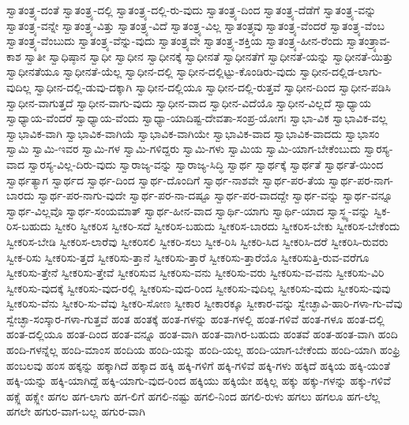 {ಸ್ವಾತಂತ್ರ್ಯ-ದಂತೆ
ಸ್ವಾತಂತ್ರ್ಯ-ದಲ್ಲಿ
ಸ್ವಾತಂತ್ರ್ಯ-ದಲ್ಲಿ-ರು-ವುದು
ಸ್ವಾತಂತ್ರ್ಯ-ದಿಂದ
ಸ್ವಾತಂತ್ರ್ಯ-ದೆಡೆಗೆ
ಸ್ವಾತಂತ್ರ್ಯ-ವನ್ನು
ಸ್ವಾತಂತ್ರ್ಯ-ವನ್ನೇ
ಸ್ವಾತಂತ್ರ್ಯ-ವಿತ್ತು
ಸ್ವಾತಂತ್ರ್ಯ-ವಿದೆ
ಸ್ವಾತಂತ್ರ್ಯ-ವಿಲ್ಲ
ಸ್ವಾತಂತ್ರ್ಯವು
ಸ್ವಾತಂತ್ರ್ಯ-ವೆಂದರೆ
ಸ್ವಾತಂತ್ರ್ಯ-ವೆಂಬ
ಸ್ವಾತಂತ್ರ್ಯ-ವೆಂಬುದು
ಸ್ವಾತಂತ್ರ್ಯ-ವೆನ್ನು-ವುದು
ಸ್ವಾತಂತ್ರ್ಯವೇ
ಸ್ವಾತಂತ್ರ್ಯ-ಶಕ್ತಿಯ
ಸ್ವಾತಂತ್ರ್ಯ-ಹೀನ-ರೆಂದು
ಸ್ವಾತಂತ್ರ್ಯಾವ-ಕಾಶ
ಸ್ವಾತೀ
ಸ್ವಾಧಿಷ್ಠಾನ
ಸ್ವಾಧೀ
ಸ್ವಾಧೀನ
ಸ್ವಾಧೀನಕ್ಕೆ
ಸ್ವಾಧೀನತೆ
ಸ್ವಾಧೀನತೆಗೆ
ಸ್ವಾಧೀನತೆ-ಯನ್ನು
ಸ್ವಾಧೀನತೆ-ಯಿತ್ತು
ಸ್ವಾಧೀನತೆಯೂ
ಸ್ವಾಧೀನತೆ-ಯೆಲ್ಲ
ಸ್ವಾಧೀನ-ದಲ್ಲಿ
ಸ್ವಾಧೀನ-ದಲ್ಲಿಟ್ಟು-ಕೊಂಡಿರು-ವುದು
ಸ್ವಾಧೀನ-ದಲ್ಲಿಡ-ಲಾಗು-ವುದಿಲ್ಲ
ಸ್ವಾಧೀನ-ದಲ್ಲಿ-ಡುವು-ದಕ್ಕಾಗಿ
ಸ್ವಾಧೀನ-ದಲ್ಲಿಯೂ
ಸ್ವಾಧೀನ-ದಲ್ಲಿ-ರುತ್ತವೆ
ಸ್ವಾಧೀನ-ದಿಂದ
ಸ್ವಾಧೀನ-ಪಡಿಸಿ
ಸ್ವಾಧೀನ-ವಾಗುತ್ತದೆ
ಸ್ವಾಧೀನ-ವಾಗು-ವುದು
ಸ್ವಾಧೀನ-ವಾದ
ಸ್ವಾಧೀನ-ವಿದೆಯೊ
ಸ್ವಾಧೀನ-ವಿಲ್ಲದೆ
ಸ್ವಾಧ್ಯಾಯ
ಸ್ವಾಧ್ಯಾಯ-ವೆಂದರೆ
ಸ್ವಾಧ್ಯಾಯ-ವೆಂದು
ಸ್ವಾಧ್ಯಾ-ಯಾದಿಷ್ಟ-ದೇವತಾ-ಸಂಪ್ರ-ಯೋಗಃ
ಸ್ವಾಭಾ-ವಿಕ
ಸ್ವಾಭಾವಿಕ-ವಲ್ಲ
ಸ್ವಾಭಾವಿಕ-ವಾಗಿ
ಸ್ವಾಭಾವಿಕ-ವಾಗಿಯೆ
ಸ್ವಾಭಾವಿಕ-ವಾಗಿಯೇ
ಸ್ವಾಭಾವಿಕ-ವಾದ
ಸ್ವಾಭಾವಿಕ-ವಾದದು
ಸ್ವಾಭಾಸಂ
ಸ್ವಾಮಿ
ಸ್ವಾಮಿ-ಇವರ
ಸ್ವಾಮಿ-ಗಳ
ಸ್ವಾಮಿ-ಗಳಿದ್ದರು
ಸ್ವಾಮಿ-ಗಳು
ಸ್ವಾಮಿಯ
ಸ್ವಾಮಿ-ಯಾಗ-ಬೇಕೆಂಬುದು
ಸ್ವಾರಸ್ಯ-ವಾದ
ಸ್ವಾರಸ್ಯ-ವಿಲ್ಲ-ದಿರು-ವುದು
ಸ್ವಾರಾಜ್ಯ-ವನ್ನು
ಸ್ವಾರಾಜ್ಯ-ಸಿದ್ಧಿ
ಸ್ವಾರ್ಥ
ಸ್ವಾರ್ಥಕ್ಕೆ
ಸ್ವಾರ್ಥತೆ
ಸ್ವಾರ್ಥತೆ-ಯಿಂದ
ಸ್ವಾರ್ಥತ್ಯಾಗ
ಸ್ವಾರ್ಥದ
ಸ್ವಾರ್ಥ-ದಿಂದ
ಸ್ವಾರ್ಥ-ದೊಂದಿಗೆ
ಸ್ವಾರ್ಥ-ನಾಶವೇ
ಸ್ವಾರ್ಥ-ಪರ-ತೆಯ
ಸ್ವಾರ್ಥ-ಪರ-ನಾಗ-ಬಾರದು
ಸ್ವಾರ್ಥ-ಪರ-ನಾಗು-ವುದೇ
ಸ್ವಾರ್ಥ-ಪರ-ನಾ-ದಷ್ಟೂ
ಸ್ವಾರ್ಥ-ಪರ-ವಾದದ್ದೇ
ಸ್ವಾರ್ಥ-ವನ್ನು
ಸ್ವಾರ್ಥ-ವನ್ನೂ
ಸ್ವಾರ್ಥ-ವಿಲ್ಲವೊ
ಸ್ವಾರ್ಥ-ಸಂಯಮಾತ್
ಸ್ವಾರ್ಥ-ಹೀನ-ವಾದ
ಸ್ವಾರ್ಥಿ-ಯಾಗು
ಸ್ವಾರ್ಥಿ-ಯಾದ
ಸ್ವಾಸ್ಥ್ಯ-ವನ್ನು
ಸ್ವಿಕ-ರಿಸ-ಬಹುದು
ಸ್ವೀಕರಿ
ಸ್ವೀಕರಿಸ
ಸ್ವೀಕರಿ-ಸದೆ
ಸ್ವೀಕರಿಸ-ಬಹುದು
ಸ್ವೀಕರಿಸ-ಬಾರದು
ಸ್ವೀಕರಿಸ-ಬೇಕು
ಸ್ವೀಕರಿಸ-ಬೇಕೆಂದು
ಸ್ವೀಕರಿಸ-ಬೇಡಿ
ಸ್ವೀಕರಿಸ-ಲಾರೆವು
ಸ್ವೀಕರಿಸಲಿ
ಸ್ವೀಕರಿ-ಸಲು
ಸ್ವೀಕ-ರಿಸಿ
ಸ್ವೀಕರಿ-ಸಿದ
ಸ್ವೀಕರಿಸಿ-ದರೆ
ಸ್ವೀಕರಿಸಿ-ರುವರು
ಸ್ವೀಕ-ರಿಸು
ಸ್ವೀಕರಿಸು-ತ್ತದೆ
ಸ್ವೀಕರಿಸು-ತ್ತಾನೆ
ಸ್ವೀಕರಿಸು-ತ್ತಾರೆ
ಸ್ವೀಕರಿಸು-ತ್ತಾರೆಯೊ
ಸ್ವೀಕರಿಸುತ್ತಿ-ರುವ-ವರೆಗೂ
ಸ್ವೀಕರಿಸು-ತ್ತೇನೆ
ಸ್ವೀಕರಿಸು-ತ್ತೇವೆ
ಸ್ವೀಕರಿಸುವ
ಸ್ವೀಕರಿಸು-ವನು
ಸ್ವೀಕರಿಸು-ವರು
ಸ್ವೀಕರಿಸು-ವ-ವನು
ಸ್ವೀಕರಿಸು-ವಿರಿ
ಸ್ವೀಕರಿಸು-ವುದಕ್ಕೆ
ಸ್ವೀಕರಿಸು-ವುದ-ರಲ್ಲಿ
ಸ್ವೀಕರಿಸು-ವುದ-ರಿಂದ
ಸ್ವೀಕರಿಸು-ವುದಿಲ್ಲ
ಸ್ವೀಕರಿಸು-ವುದು
ಸ್ವೀಕರಿಸು-ವುವು
ಸ್ವೀಕರಿಸು-ವೆನು
ಸ್ವೀಕರಿ-ಸು-ವೆವು
ಸ್ವೀಕರಿ-ಸೋಣ
ಸ್ವೀಕಾರ
ಸ್ವೀಕಾರಕ್ಕೂ
ಸ್ವೀಕಾರ-ವನ್ನು
ಸ್ವೇಚ್ಛಾವಿ-ಹಾರಿ-ಗಳಾ-ಗು-ವೆವು
ಸ್ವೇಚ್ಛಾ-ಸಂಸ್ಕಾರ-ಗಳಾ-ಗುತ್ತವೆ
ಹಂತ
ಹಂತಕ್ಕೆ
ಹಂತ-ಗಳನ್ನು
ಹಂತ-ಗಳಲ್ಲಿ
ಹಂತ-ಗಳಿವೆ
ಹಂತ-ಗಳೂ
ಹಂತ-ದಲ್ಲಿ
ಹಂತ-ದಲ್ಲಿಯೂ
ಹಂತ-ದಿಂದ
ಹಂತ-ವನ್ನೂ
ಹಂತ-ವಾಗಿ
ಹಂತ-ವಾಗಿರ-ಬಹುದು
ಹಂತವೆ
ಹಂತ-ಹಂತ-ವಾಗಿ
ಹಂದಿ
ಹಂದಿ-ಗಳನ್ನೆಲ್ಲ
ಹಂದಿ-ಮಾಂಸ
ಹಂದಿಯ
ಹಂದಿ-ಯನ್ನು
ಹಂದಿ-ಯಲ್ಲ
ಹಂದಿ-ಯಾಗ-ಬೇಕೆಂದು
ಹಂದಿ-ಯಾಗಿ
ಹಂಫ್ರಿ
ಹಂಬಲವು
ಹಂಸ
ಹಕ್ಕನ್ನು
ಹಕ್ಕಾಗಿದೆ
ಹಕ್ಕಾದ
ಹಕ್ಕಿ
ಹಕ್ಕಿ-ಗಳಿಗೆ
ಹಕ್ಕಿ-ಗಳಿವೆ
ಹಕ್ಕಿ-ಗಳು
ಹಕ್ಕಿದೆ
ಹಕ್ಕಿಯ
ಹಕ್ಕಿ-ಯಂತೆ
ಹಕ್ಕಿ-ಯನ್ನು
ಹಕ್ಕಿ-ಯಾಗಿದ್ದೆ
ಹಕ್ಕಿ-ಯಾಗು-ವುದ-ರಿಂದ
ಹಕ್ಕಿಯು
ಹಕ್ಕಿಯೇ
ಹಕ್ಕಿಲ್ಲ
ಹಕ್ಕು
ಹಕ್ಕು-ಗಳನ್ನು
ಹಕ್ಕು-ಗಳಿವೆ
ಹಕ್ಸ್ಲೆ
ಹಕ್ಸ್ಲೇ
ಹಗಲ
ಹಗ-ಲಾಗು
ಹಗ-ಲಿಗೆ
ಹಗಲಿ-ನಷ್ಟು
ಹಗಲಿ-ನಿಂದ
ಹಗಲಿ-ರುಳು
ಹಗಲು
ಹಗಲೂ
ಹಗ-ಲೆಲ್ಲ
ಹಗಲೇ
ಹಗುರ-ವಾಗ-ಬಲ್ಲ
ಹಗುರ-ವಾಗಿ
}
